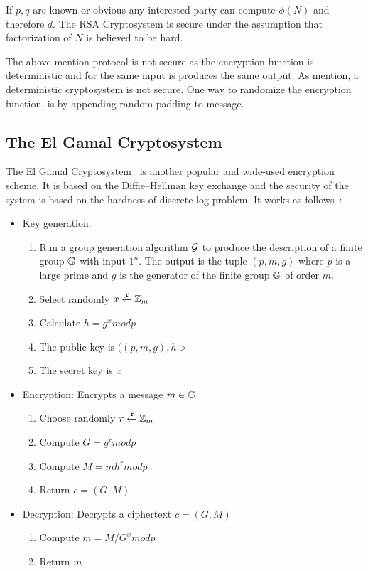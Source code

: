 If $p, q$ are known or obvious any interested party can compute $\phi(N)$ and therefore $d$. The RSA Cryptosystem is secure under the assumption that factorization of $N$ is believed to be hard.

The above mention protocol is not secure as the encryption function is deterministic and for the same input is produces the same output. As mention, a deterministic cryptosystem is not secure. One way to randomize the encryption function, is by appending random padding to message.

\subsection{The El Gamal Cryptosystem}
\label{preliminaries:pub:el_gamal}

The El Gamal Cryptosystem~\cite{el_gamal} is another popular and wide-used encryption scheme. It is based on the Diffie–Hellman key exchange and the security of the system is based on the hardness of discrete log problem. It works as follows~\cite{Katz:2014:IMC:2700550, kiagias:crypto}:

\begin{itemize}
  \item Key generation:
    \begin{enumerate}
        \item Run a group generation algorithm $\mathcal{G}$ to produce the description of a finite group $\mathbb{G}$ with input $1^{n}$. The output is the tuple $(p, m, g)$ where $p$ is a large prime and $g$ is the generator of the finite group $\mathbb{G}$ of order $m$.
        \item Select randomly $x \xleftarrow{\mathtt{r}}{\mathbb{Z}_m}$
        \item Calculate $h = g^{x}modp$
        \item The public key is $((p, m, g), h>$
        \item The secret key is $x$
    \end{enumerate}
  \item Encryption: Encrypts a message $m \in \mathbb{G}$
    \begin{enumerate}
      \item Choose randomly $r \xleftarrow{\mathtt{r}}{\mathbb{Z}_m}$
      \item Compute $G = g^{r}modp$
      \item Compute $M = mh^{r}modp$
      \item Return $c = (G, M)$
    \end{enumerate}
  \item Decryption: Decrypts a ciphertext $c = (G, M)$
    \begin{enumerate}
      \item Compute $m = M / G^{x} modp$
      \item Return $m$
    \end{enumerate}
\end{itemize}

